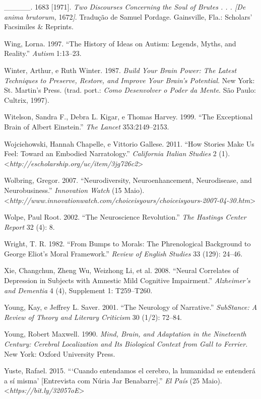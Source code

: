{\begin{Parskip}
\_\_\_\_\_. 1683 {[}1971{]}. \emph{Two Discourses Concerning the Soul of
Brutes . . . {[}De anima brutorum,} 1672\emph{{]}}. Tradução de Samuel
Pordage. Gainsville, Fla.: Scholars' Facsimiles \& Reprints.

Wing, Lorna. 1997. ``The History of Ideas on Autism: Legends, Myths, and
Reality.'' \emph{Autism} 1:13--23.

Winter, Arthur, e Ruth Winter. 1987. \emph{Build Your Brain Power: The
Latest Techniques to Preserve, Restore, and Improve Your Brain's
Potential.} New York: St. Martin's Press. (trad. port.: \emph{Como
Desenvolver o Poder da Mente}. São Paulo: Cultrix, 1997).

Witelson, Sandra F., Debra L. Kigar, e Thomas Harvey. 1999. ``The
Exceptional Brain of Albert Einstein.'' \emph{The Lancet}
353:2149--2153.

Wojciehowski, Hannah Chapelle, e Vittorio Gallese. 2011. ``How Stories
Make Us Feel: Toward an Embodied Narratology.'' \emph{California Italian
Studies} 2 (1). \textless{}\emph{http://escholarship.org/uc/item/3jg726c2}\textgreater{}

Wolbring, Gregor. 2007. ``Neurodiversity, Neuroenhancement,
Neurodisease, and Neurobusiness.'' \emph{Innovation Watch} (15 Maio).
\textless{}\emph{http://www.innovationwatch.com/choiceisyours/choiceisyours-2007-04-30.htm}\textgreater{}

Wolpe, Paul Root. 2002. ``The Neuroscience Revolution.'' \emph{The
Hastings Center Report} 32 (4): 8.

Wright, T. R. 1982. ``From Bumps to Morals: The Phrenological Background
to George Eliot's Moral Framework.'' \emph{Review of English Studies} 33
(129): 24--46.

Xie, Changchun, Zheng Wu, Weizhong Li, et al. 2008. ``Neural Correlates
of Depression in Subjects with Amnestic Mild Cognitive Impairment.''
\emph{Alzheimer's and Dementia} 4 (4), Supplement 1: T259--T260.

Young, Kay, e Jeffrey L. Saver. 2001. ``The Neurology of Narrative.''
\emph{SubStance: A Review of Theory and Literary Criticism} 30 (1/2):
72--84.

Young, Robert Maxwell. 1990. \emph{Mind, Brain, and Adaptation in the
Nineteenth Century: Cerebral Localization and Its Biological Context
from Gall to Ferrier.} New York: Oxford University Press.

Yuste, Rafael. 2015. ```Cuando entendamos el cerebro, la humanidad se
entenderá a sí misma' {[}Entrevista com Núria Jar Benabarre{]}.''
\emph{El País} (25 Maio).
\textless{}\emph{https://bit.ly/32057oE}\textgreater{}


\end{Parskip}}
